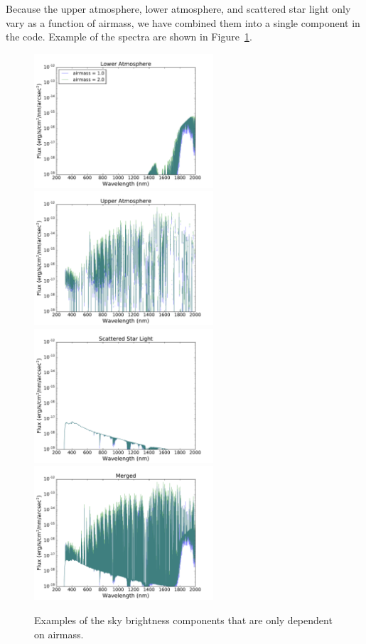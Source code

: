 \documentclass[]{spie}
\begin{document}
Because the upper atmosphere, lower atmosphere, and scattered star light only vary as a function of airmass, we have combined them into a single component in the code. Example of the spectra are shown in Figure~\ref{fig:merged}.


\begin{figure}[ht]
  \begin{center}
  \includegraphics[height=5cm]{plots/merged0.pdf}\includegraphics[height=5cm]{plots/merged1.pdf} \\
  \includegraphics[height=5cm]{plots/merged2.pdf}\includegraphics[height=5cm]{plots/merged3.pdf}
  \end{center}
  \caption{Examples of the sky brightness components that are only dependent on airmass. \label{fig:merged}}
\end{figure}
\end{document}
